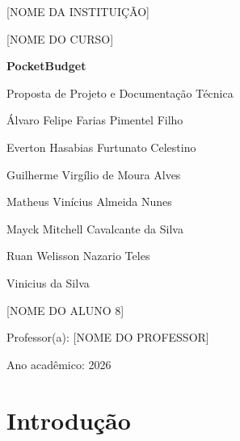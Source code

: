 \documentclass[12pt,a4paper]{article}
\begin{document}
\begin{titlepage}
    \centering
    \vspace*{2cm}

    {\large [NOME DA INSTITUIÇÃO]}\par
    \vspace{0.3cm}
    {\large [NOME DO CURSO]}\par

    \vspace{4cm}

    {\Huge \textbf{PocketBudget}}\par
    \vspace{0.5cm}
    {\Large Proposta de Projeto e Documentação Técnica}\par

    \vspace{4cm}

    {\large Álvaro Felipe Farias Pimentel Filho}\par
    {\large Everton Hasabias Furtunato Celestino }\par
    {\large Guilherme Virgílio de Moura Alves}\par
    {\large Matheus Vinícius Almeida Nunes}\par
    {\large Mayck Mitchell Cavalcante da Silva}\par
    {\large Ruan Welisson Nazario Teles}\par
    {\large Vinicius da Silva}\par
    {\large [NOME DO ALUNO 8]}\par

    \vfill

    {\large Professor(a): [NOME DO PROFESSOR]}\par
    \vspace{0.5cm}
    {\large Ano acadêmico: 2026}\par
    \vspace{0.5cm}

    \vspace{1cm}
\end{titlepage}

\tableofcontents
\newpage

\section{Introdução}
\end{document}
